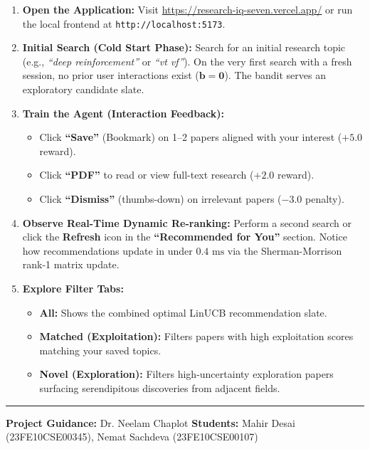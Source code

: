 \documentclass[11pt,a4paper]{article}
\begin{document}
\begin{enumerate}[leftmargin=1.8em, itemsep=6pt]
    \item \textbf{Open the Application:} Visit \url{https://research-iq-seven.vercel.app/} or run the local frontend at \texttt{http://localhost:5173}.
    
    \item \textbf{Initial Search (Cold Start Phase):} Search for an initial research topic (e.g., \textit{``deep reinforcement''} or \textit{``vt vf''}). On the very first search with a fresh session, no prior user interactions exist ($\mathbf{b} = \mathbf{0}$). The bandit serves an exploratory candidate slate.
    
    \item \textbf{Train the Agent (Interaction Feedback):}
    \begin{itemize}[leftmargin=1.5em, itemsep=3pt]
        \item Click \textbf{``Save''} (Bookmark) on 1--2 papers aligned with your interest ($+5.0$ reward).
        \item Click \textbf{``PDF''} to read or view full-text research ($+2.0$ reward).
        \item Click \textbf{``Dismiss''} (thumbs-down) on irrelevant papers ($-3.0$ penalty).
    \end{itemize}
    
    \item \textbf{Observe Real-Time Dynamic Re-ranking:} Perform a second search or click the \textbf{Refresh} icon in the \textbf{``Recommended for You''} section. Notice how recommendations update in under $0.4\text{ ms}$ via the Sherman-Morrison rank-1 matrix update.
    
    \item \textbf{Explore Filter Tabs:}
    \begin{itemize}[leftmargin=1.5em, itemsep=3pt]
        \item \textbf{All:} Shows the combined optimal LinUCB recommendation slate.
        \item \textbf{Matched (Exploitation):} Filters papers with high exploitation scores matching your saved topics.
        \item \textbf{Novel (Exploration):} Filters high-uncertainty exploration papers surfacing serendipitous discoveries from adjacent fields.
    \end{itemize}
\end{enumerate}

\vfill
\noindent\rule{\linewidth}{0.6pt}
\vspace{0.1cm}
{\footnotesize \textbf{Project Guidance:} Dr. Neelam Chaplot \hfill \textbf{Students:} Mahir Desai (23FE10CSE00345), Nemat Sachdeva (23FE10CSE00107)}
\vspace{0.2cm}
\end{document}
